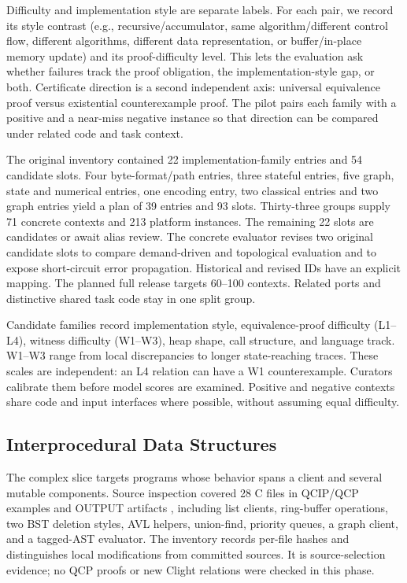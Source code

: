 \documentclass{article}
\begin{document}
Difficulty and implementation style are separate labels. For each pair, we record its style contrast (e.g., recursive/accumulator, same algorithm/different control flow, different algorithms, different data representation, or buffer/in-place memory update) and its proof-difficulty level. This lets the evaluation ask whether failures track the proof obligation, the implementation-style gap, or both. Certificate direction is a second independent axis: universal equivalence proof versus existential counterexample proof. The pilot pairs each family with a positive and a near-miss negative instance so that direction can be compared under related code and task context.

The original inventory contained 22 implementation-family entries and 54 candidate slots. Four byte-format/path entries, three stateful entries, five graph, state and numerical entries, one encoding entry, two classical entries and two graph entries yield a plan of 39 entries and 93 slots. Thirty-three groups supply 71 concrete contexts and 213 platform instances. The remaining 22 slots are candidates or await alias review. The concrete evaluator revises two original candidate slots to compare demand-driven and topological evaluation and to expose short-circuit error propagation. Historical and revised IDs have an explicit mapping. The planned full release targets 60--100 contexts. Related ports and distinctive shared task code stay in one split group.

Candidate families record implementation style, equivalence-proof difficulty (L1--L4), witness difficulty (W1--W3), heap shape, call structure, and language track. W1--W3 range from local discrepancies to longer state-reaching traces. These scales are independent: an L4 relation can have a W1 counterexample. Curators calibrate them before model scores are examined. Positive and negative contexts share code and input interfaces where possible, without assuming equal difficulty.

\subsection{Interprocedural Data Structures}

The complex slice targets programs whose behavior spans a client and several mutable components. Source inspection covered 28 C files in QCIP/QCP examples and OUTPUT artifacts \citep{qcp2026source}, including list clients, ring-buffer operations, two BST deletion styles, AVL helpers, union-find, priority queues, a graph client, and a tagged-AST evaluator. The inventory records per-file hashes and distinguishes local modifications from committed sources. It is source-selection evidence; no QCP proofs or new Clight relations were checked in this phase.
\end{document}
